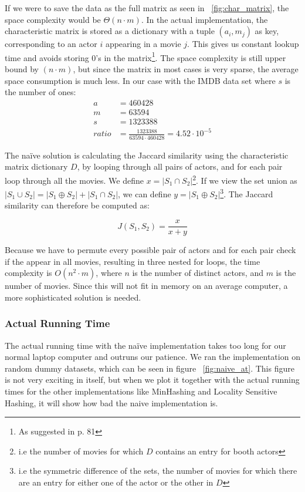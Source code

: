 \documentclass[a4paper,11pt]{article}
\begin{document}
If we were to save the data as the full matrix as seen in ~\ref{fig:char_matrix}, the space complexity would be $\Theta (n \cdot m)$. In the actual implementation,  the characteristic matrix is stored as a dictionary with a tuple $(a_i,m_j)$ as key, corresponding to an actor $i$ appearing in a movie $j$. This gives us constant lookup time and avoids storing 0's in the matrix\footnote{As suggested in \cite{book:mmds} p. 81}. The space complexity is still upper bound by $(n \cdot m)$, but since the matrix in most cases is very sparse, the average space consumption is much less. In our case with the IMDB data set where $s$ is the number of ones:
\begin{equation}
\begin{aligned}
a &= 460428\\
m &= 63594\\
s &= 1323388\\
ratio &= \frac{1323388}{63594 \cdot 460428} = 4.52\cdot 10^{-5}
\end{aligned}
\end{equation}

The naïve solution  is calculating the Jaccard similarity using the characteristic matrix dictionary $D$, by looping through all pairs of actors, and for each pair loop through all the movies. We define $x = |S_1 \cap S_2|$\footnote{i.e the number of movies for which $D$ contains an entry for booth actors}. If we view the set union as $|S_1 \cup S_2| = |S_1 \oplus S_2| + |S_1 \cap S_2|$, we can define $y = |S_1 \oplus S_2|$\footnote{i.e the symmetric difference of the sets, the number of movies for which there are an entry for either one of the actor or the other in $D$}. The Jaccard similarity can therefore be computed as:

\begin{equation}
J(S_1,S_2) = \frac{x}{x+y}
\end{equation}

Because we have to permute every possible pair of actors and for each pair check if the appear in all movies, resulting in three nested for loops, the time complexity is $O(n^2 \cdot m)$, where $n$ is the number of distinct actors, and $m$ is the number of movies. Since this will not fit in memory on an average computer, a more sophisticated solution is needed. \\

\subsubsection{Actual Running Time}
The actual running time with the naïve implementation takes too long for our normal laptop computer and outruns our patience. We ran the implementation on random dummy datasets, which can be seen in figure ~\ref{fig:naive_at}. This figure is not very exciting in itself, but when we plot it together with the actual running times for the other implementations like MinHashing and Locality Sensitive Hashing, it will show how bad the naive implementation is. \\
\end{document}
